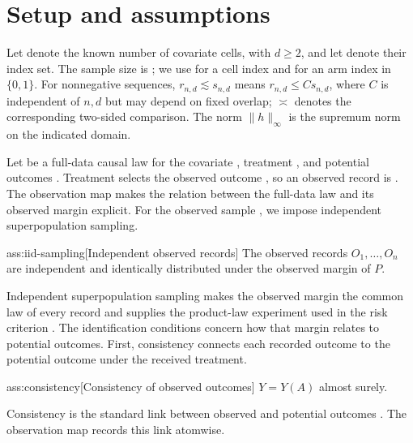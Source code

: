 \section{Setup and assumptions}

Let  denote the known number of covariate cells, with \(d\ge2\), and let  denote their index set. The sample size is ; we use  for a cell index and  for an arm index in \(\{0,1\}\). For nonnegative sequences, \(r_{n,d}\lesssim s_{n,d}\) means \(r_{n,d}\le C s_{n,d}\), where \(C\) is independent of \(n,d\) but may depend on fixed overlap; \(\asymp\) denotes the corresponding two-sided comparison. The norm \(\|h\|_\infty\) is the supremum norm on the indicated domain.

Let  be a full-data causal law for the covariate , treatment , and potential outcomes . Treatment selects the observed outcome , so an observed record is . The observation map makes the relation between the full-data law and its observed margin explicit. For the observed sample , we impose independent superpopulation sampling.

\begin{assumptionv}{ass:iid-sampling}[Independent observed records]
The observed records \(O_1,\ldots,O_n\) are independent and identically distributed under the observed margin of \(P\).
\end{assumptionv}

Independent superpopulation sampling makes the observed margin the common law of every record and supplies the product-law experiment used in the risk criterion \citep{vanDerVaart1998}. The identification conditions concern how that margin relates to potential outcomes. First, consistency connects each recorded outcome to the potential outcome under the received treatment.

\begin{assumptionv}{ass:consistency}[Consistency of observed outcomes]
\(Y=Y(A)\) almost surely.
\end{assumptionv}

Consistency is the standard link between observed and potential outcomes \citep{HernanRobins2020}. The observation map records this link atomwise.

